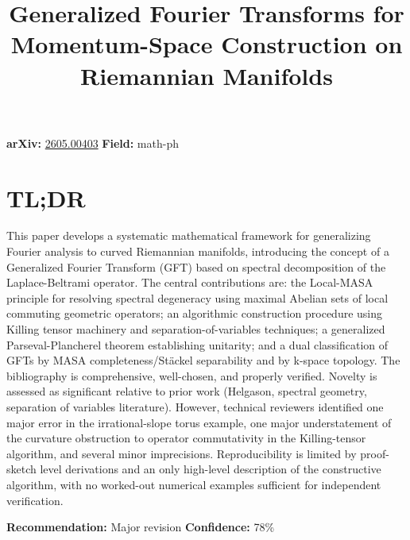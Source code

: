 \documentclass[11pt]{article}
\title{Generalized Fourier Transforms for Momentum-Space Construction on Riemannian Manifolds}
\date{}
\begin{document}
\maketitle

\noindent\textbf{arXiv:} \href{https://arxiv.org/abs/2605.00403}{2605.00403} \quad \textbf{Field:} math-ph\\

\section*{TL;DR}
This paper develops a systematic mathematical framework for generalizing Fourier analysis to curved Riemannian manifolds, introducing the concept of a Generalized Fourier Transform (GFT) based on spectral decomposition of the Laplace-Beltrami operator. The central contributions are: the Local-MASA principle for resolving spectral degeneracy using maximal Abelian sets of local commuting geometric operators; an algorithmic construction procedure using Killing tensor machinery and separation-of-variables techniques; a generalized Parseval-Plancherel theorem establishing unitarity; and a dual classification of GFTs by MASA completeness/Stäckel separability and by k-space topology. The bibliography is comprehensive, well-chosen, and properly verified. Novelty is assessed as significant relative to prior work (Helgason, spectral geometry, separation of variables literature). However, technical reviewers identified one major error in the irrational-slope torus example, one major understatement of the curvature obstruction to operator commutativity in the Killing-tensor algorithm, and several minor imprecisions. Reproducibility is limited by proof-sketch level derivations and an only high-level description of the constructive algorithm, with no worked-out numerical examples sufficient for independent verification.

\textbf{Recommendation:} Major revision \quad \textbf{Confidence:} 78\%\\
\end{document}

